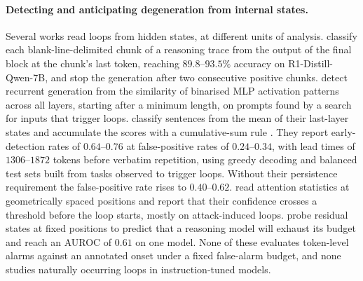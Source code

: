 \paragraph{Detecting and anticipating degeneration from internal states.}
Several works read loops from hidden states, at different units of analysis.
\citet{xie2025wordsalad} classify each blank-line-delimited chunk of a
reasoning trace from the output of the final block at the chunk's last token,
reaching $89.8$--$93.5\%$ accuracy on R1-Distill-Qwen-7B, and stop the
generation after two consecutive positive chunks. \citet{yu2025breaking} detect
recurrent generation from the similarity of binarised MLP activation patterns
across all layers, starting after a minimum length, on prompts found by a
search for inputs that trigger loops. \citet{duan2026circular} classify
sentences from the mean of their last-layer states and accumulate the scores
with a cumulative-sum rule \citep{page1954cusum}. They report early-detection
rates of $0.64$--$0.76$ at false-positive rates of $0.24$--$0.34$, with lead
times of $1306$--$1872$ tokens before verbatim repetition, using greedy decoding
and balanced test sets built from tasks observed to trigger loops. Without
their persistence requirement the false-positive rate rises to
$0.40$--$0.62$. \citet{zhang2026radar} read attention statistics at
geometrically spaced positions and report that their confidence crosses a
threshold before the loop starts, mostly on attack-induced loops.
\citet{oladri2026token} probe residual states at fixed positions to predict
that a reasoning model will exhaust its budget and reach an AUROC of $0.61$
on one model. None of these evaluates token-level alarms against an annotated
onset under a fixed false-alarm budget, and none studies naturally occurring
loops in instruction-tuned models.

